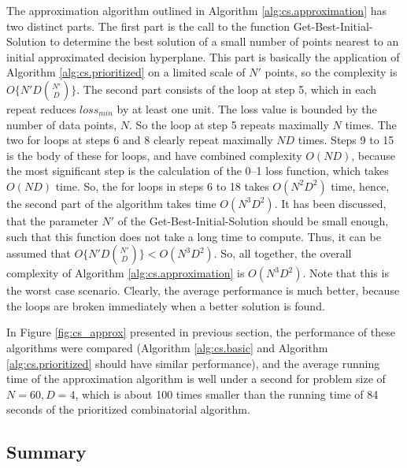 The approximation algorithm outlined in Algorithm \ref{alg:cs.approximation} has two distinct parts. The first part is the call to the function {\sc Get-Best-Initial-Solution} to determine the best solution of a small number of points nearest to an initial approximated decision hyperplane. This part is basically the application of Algorithm \ref{alg:cs.prioritized} on a limited scale of  $N'$ points, so the complexity is $O\{ N'D{N' \choose D} \}$. The second part consists of the loop at step 5, which in each repeat reduces $loss_{min}$ by at least one unit. The loss value is bounded by the number of data points, $N$. So the loop at step 5 repeats maximally $N$ times. The two for loops at steps 6 and 8 clearly repeat maximally $ND$ times. Steps 9 to 15 is the body of these for loops, and have combined complexity $O(ND)$, because the most significant step is the calculation of the 0--1 loss function, which takes $O(ND)$ time. So, the for loops in steps 6 to 18 takes $O(N^2D^2)$ time, hence, the second part of the algorithm takes time $O(N^3D^2)$. It has been discussed, that the parameter $N'$ of the {\sc Get-Best-Initial-Solution} should be small enough, such that this function does not take a long time to compute. Thus, it can be assumed that $O\{ N'D{N' \choose D} \} < O(N^3D^2)$. So, all together, the overall complexity of Algorithm \ref{alg:cs.approximation} is $O(N^3D^2)$. Note that this is the worst case scenario. Clearly, the average performance is much better, because the loops are broken immediately when a better solution is found. 

In Figure \ref{fig:cs_approx} presented in previous section, the performance of these algorithms were compared (Algorithm \ref{alg:cs.basic} and Algorithm \ref{alg:cs.prioritized} should have similar performance), and the average running time of the approximation algorithm is well under a second for problem size of $N=60, D=4$, which is about 100 times smaller than the running time of 84 seconds of the prioritized combinatorial algorithm.

\subsection{Summary}
\label{sec:cs.summary}

